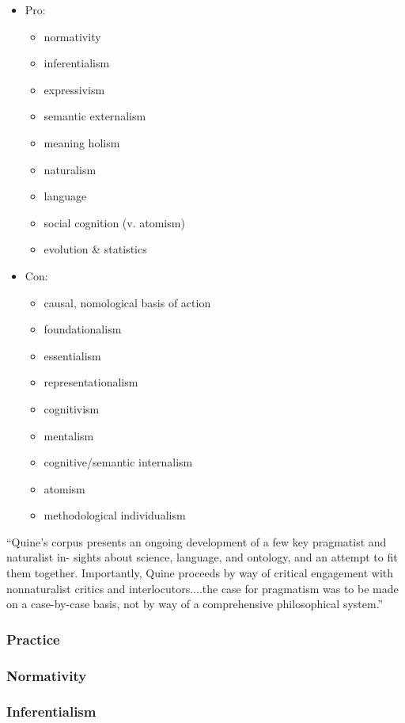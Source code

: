 \documentclass[11pt,twoside]{article}
\begin{document}
\begin{itemize}
\item Pro:
  \begin{itemize}
  \item normativity
  \item inferentialism
  \item expressivism
  \item semantic externalism
  \item meaning holism
  \item naturalism
  \item language
  \item social cognition (v. atomism)
  \item evolution \& statistics
  \end{itemize}
\item Con:
  \begin{itemize}
  \item causal, nomological basis of action
  \item foundationalism
  \item essentialism
  \item representationalism
  \item cognitivism
  \item mentalism
  \item cognitive/semantic internalism
  \item atomism
  \item methodological individualism
  \end{itemize}
\end{itemize}

``Quine’s corpus presents an ongoing development of a few key
pragmatist and naturalist in- sights about science, language, and
ontology, and an attempt to fit them together. Importantly, Quine
proceeds by way of critical engagement with nonnaturalist critics and
interlocutors....the case for pragmatism was to be made on a
case-by-case basis, not by way of a comprehensive philosophical
system.'' \parencite[8-9]{talisse_pragmatism_2011}

\subsubsection{Practice}
\subsubsection{Normativity}
\subsubsection{Inferentialism}
\end{document}

